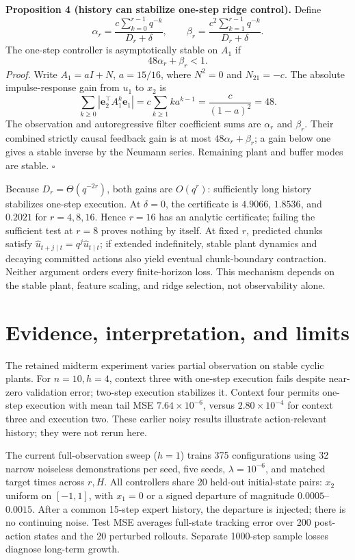 \documentclass[11pt]{article}
\begin{document}
\medskip
\noindent\textbf{Proposition 4 (history can stabilize one-step ridge control).}
Define
\[
\alpha_r=\frac{c\sum_{k=0}^{r-1}q^{-k}}{D_r+\delta},\qquad
\beta_r=\frac{c^2\sum_{k=1}^{r-1}q^{-k}}{D_r+\delta}.
\]
The one-step controller is asymptotically stable on $A_1$ if
\[
48\alpha_r+\beta_r<1.
\]
\emph{Proof.} Write $A_1=aI+N$, $a=15/16$, where $N^2=0$ and $N_{21}=-c$.
The absolute impulse-response gain from $u_1$ to $x_2$ is
\[
\sum_{k\ge0}|\mathbf e_2^\top A_1^k\mathbf e_1|
=c\sum_{k\ge1}k a^{k-1}=\frac{c}{(1-a)^2}=48.
\]
The observation and autoregressive filter coefficient sums are $\alpha_r$ and $\beta_r$. Their combined strictly causal feedback gain is at most $48\alpha_r+\beta_r$; a gain below one gives a stable inverse by the Neumann series. Remaining plant and buffer modes are stable. $\square$

Because $D_r=\Theta(q^{-2r})$, both gains are $O(q^r)$: sufficiently long history stabilizes one-step execution. At $\delta=0$, the certificate is $4.9066$, $1.8536$, and $0.2021$ for $r=4,8,16$. Hence $r=16$ has an analytic certificate; failing the sufficient test at $r=8$ proves nothing by itself. At fixed $r$, predicted chunks satisfy $\hat u_{t+j\mid t}=q^j\hat u_{t\mid t}$; if extended indefinitely, stable plant dynamics and decaying committed actions also yield eventual chunk-boundary contraction. Neither argument orders every finite-horizon loss. This mechanism depends on the stable plant, feature scaling, and ridge selection, not observability alone.

\newpage
\section{Evidence, interpretation, and limits}
The retained midterm experiment varies partial observation on stable cyclic plants. For $n=10,h=4$, context three with one-step execution fails despite near-zero validation error; two-step execution stabilizes it. Context four permits one-step execution with mean tail MSE $7.64\times10^{-6}$, versus $2.80\times10^{-4}$ for context three and execution two. These earlier noisy results illustrate action-relevant history; they were not rerun here.

The current full-observation sweep ($h=1$) trains 375 configurations using 32 narrow noiseless demonstrations per seed, five seeds, $\lambda=10^{-6}$, and matched target times across $r,H$. All controllers share 20 held-out initial-state pairs: $x_2$ uniform on $[-1,1]$, with $x_1=0$ or a signed departure of magnitude $0.0005$--$0.0015$. After a common 15-step expert history, the departure is injected; there is no continuing noise. Test MSE averages full-state tracking error over 200 post-action states and the 20 perturbed rollouts. Separate 1000-step sample losses diagnose long-term growth.
\end{document}
